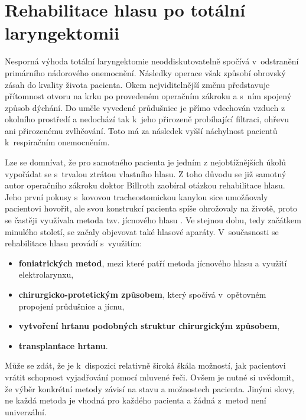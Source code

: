 \section{Rehabilitace hlasu po totální laryngektomii}
\label{chap:cause:treatment}

Nesporná výhoda totální laryngektomie neoddiskutovatelně spočívá v~odstranění
primárního nádorového onemocnění. Následky operace však způsobí obrovský
zásah do kvality života pacienta. Okem nejviditelnější změnu představuje
přítomnost otvoru na krku po provedeném operačním zákroku a s~ním spojený způsob dýchání.
Do uměle vyvedené průdušnice je přímo vdechován vzduch z okolního prostředí a nedochází tak  k~jeho přirozeně probíhající filtraci, ohřevu ani přirozenému zvlhčování. Toto má za následek vyšší náchylnost pacientů  k~respiračním onemocněním.

Lze se domnívat, že pro samotného pacienta je jedním z nejobtížnějších úkolů vypořádat se s~trvalou
ztrátou vlastního hlasu. Z toho důvodu se již samotný autor operačního zákroku doktor
Billroth zaobíral otázkou rehabilitace hlasu. Jeho první pokusy s~kovovou
tracheostomickou kanylou sice umožňovaly pacientovi hovořit, ale svou
konstrukcí pacienta spíše ohrožovaly na životě, proto se častěji využívala
metoda tzv. jícnového hlasu \cite{Sebova-Sedenkova2006}. Ve stejnou
dobu, tedy začátkem minulého století, se začaly objevovat také %
hlasové aparáty. V~současnosti se rehabilitace hlasu provádí s~využitím: %

\begin{itemize}
  \item \textbf{foniatrických metod}, mezi které patří metoda jícnového hlasu a využití elektrolarynxu,
  \item \textbf{chirurgicko-protetickým způsobem}, který spočívá v~opětovném propojení průdušnice a jícnu,
  \item \textbf{vytvoření hrtanu podobných struktur chirurgickým způsobem},
  \item \textbf{transplantace hrtanu}.
\end{itemize}

\noindent Může se zdát, že je  k~dispozici relativně široká škála
možností, jak pacientovi vrátit schopnost vyjadřování pomocí mluvené řeči.
Ovšem je nutné si uvědomit, že výběr konkrétní metody závisí na stavu
a možnostech pacienta. Jinými slovy, ne každá metoda je vhodná pro každého pacienta
a žádná z~metod není univerzální.


